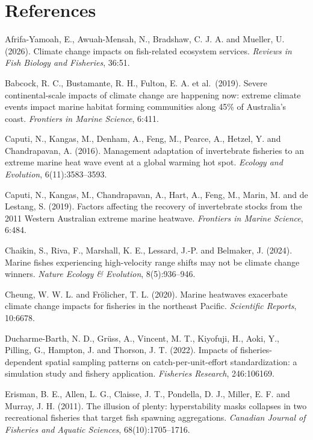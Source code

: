 \documentclass[
  11pt,
  a4paper,
]{article}
\newenvironment{hangparas}{\setlength{\parindent}{-1.5em}\setlength{\leftskip}{1.5em}\setlength{\parskip}{4pt}}{\par}
\begin{document}
\hypertarget{references}{%
\section*{References}\label{references}}
\begin{hangparas}

\hspace*{-1.5em}Afrifa-Yamoah, E., Awuah-Mensah, N., Bradshaw, C. J. A. and Mueller, U.
(2026). Climate change impacts on fish-related ecosystem services.
\emph{Reviews in Fish Biology and Fisheries}, 36:51.

Babcock, R. C., Bustamante, R. H., Fulton, E. A. et al.~(2019). Severe
continental-scale impacts of climate change are happening now: extreme
climate events impact marine habitat forming communities along 45\% of
Australia's coast. \emph{Frontiers in Marine Science}, 6:411.

Caputi, N., Kangas, M., Denham, A., Feng, M., Pearce, A., Hetzel, Y. and
Chandrapavan, A. (2016). Management adaptation of invertebrate fisheries
to an extreme marine heat wave event at a global warming hot spot.
\emph{Ecology and Evolution}, 6(11):3583--3593.

Caputi, N., Kangas, M., Chandrapavan, A., Hart, A., Feng, M., Marin, M.
and de Lestang, S. (2019). Factors affecting the recovery of
invertebrate stocks from the 2011 Western Australian extreme marine
heatwave. \emph{Frontiers in Marine Science}, 6:484.

Chaikin, S., Riva, F., Marshall, K. E., Lessard, J.-P. and Belmaker, J.
(2024). Marine fishes experiencing high-velocity range shifts may not be
climate change winners. \emph{Nature Ecology \& Evolution},
8(5):936--946.

Cheung, W. W. L. and Frölicher, T. L. (2020). Marine heatwaves
exacerbate climate change impacts for fisheries in the northeast
Pacific. \emph{Scientific Reports}, 10:6678.

Ducharme-Barth, N. D., Grüss, A., Vincent, M. T., Kiyofuji, H., Aoki,
Y., Pilling, G., Hampton, J. and Thorson, J. T. (2022). Impacts of
fisheries-dependent spatial sampling patterns on catch-per-unit-effort
standardization: a simulation study and fishery application.
\emph{Fisheries Research}, 246:106169.

Erisman, B. E., Allen, L. G., Claisse, J. T., Pondella, D. J., Miller,
E. F. and Murray, J. H. (2011). The illusion of plenty: hyperstability
masks collapses in two recreational fisheries that target fish spawning
aggregations. \emph{Canadian Journal of Fisheries and Aquatic Sciences},
68(10):1705--1716.


\end{hangparas}
\end{document}

